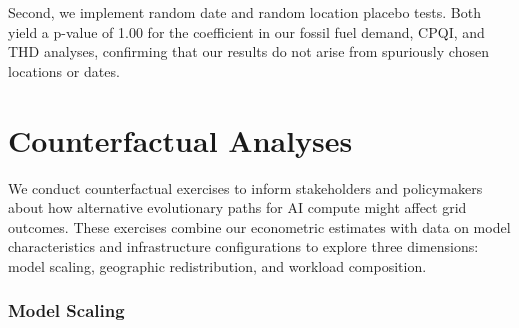 \documentclass[sigconf]{acmart}
\begin{document}
Second, we implement random date and random location placebo tests. Both yield a p-value of 1.00 for the coefficient in our fossil fuel demand, CPQI, and THD analyses, confirming that our results do not arise from spuriously chosen locations or dates.






\section{Counterfactual Analyses}
\label{sec:counterfactuals}

We conduct counterfactual exercises to inform stakeholders and policymakers about how alternative evolutionary paths for AI compute might affect grid outcomes. These exercises combine our econometric estimates with data on model characteristics and infrastructure configurations to explore three dimensions: model scaling, geographic redistribution, and workload composition.

\subsubsection{Model Scaling}
\end{document}
